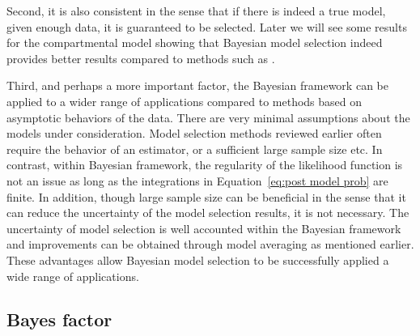Second, it is also consistent in the sense that if there is indeed a true model, given enough data, it is guaranteed to be selected. Later we will see some results for the \pet compartmental model showing that Bayesian model selection indeed provides better results compared to methods such as \aic.

Third, and perhaps a more important factor, the Bayesian framework can be applied to a wider range of applications compared to methods based on asymptotic behaviors of the data. There are very minimal assumptions about the models under consideration. Model selection methods reviewed earlier often require the  behavior of an estimator, or a sufficient large sample size etc. In contrast, within Bayesian framework, the regularity of the likelihood function is not an issue as long as the integrations in Equation~\eqref{eq:post model prob} are finite. In addition, though  large sample size can be beneficial in the sense that it can reduce the uncertainty of the model selection results, it is not necessary. The uncertainty of model selection is well accounted within the Bayesian framework and improvements can be obtained through model averaging as mentioned earlier. These advantages allow Bayesian model selection to be successfully applied  a wide range of applications.

\subsection{Bayes factor}
\label{sub:Bayes factor}


